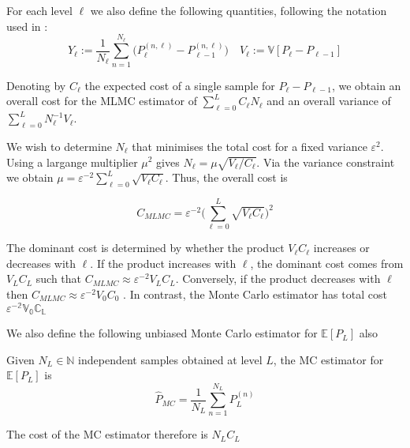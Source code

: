 For each level $\ell$ we also define the following quantities, following the notation
used in \cite{giles2015multilevel}:
\begin{equation*}
    Y_\ell := \frac{1}{N_\ell} \sum_{n=1}^{N_\ell}
    \big( P_\ell^{(n,\ell)} - P_{\ell-1}^{(n,\ell)} \big) 
    \quad
    V_\ell :=  \mathbb{V}[P_\ell - P_{\ell - 1}]
\end{equation*}

Denoting by $C_\ell$ the expected cost of a single sample for $P_\ell - P_{\ell - 1}$,
we obtain an overall cost for the MLMC estimator of $\sum_{\ell=0}^L C_\ell N_\ell$ and 
an overall variance of $\sum_{\ell=0}^L N_\ell^{-1} V_\ell$.

We wish to determine $N_\ell$ that minimises the total cost for a fixed variance $\varepsilon^2$.
Using a largange multiplier $\mu^2$ gives $N_\ell = \mu \sqrt{V_\ell / C_\ell}$. 
Via the variance constraint we obtain $\mu = \varepsilon^{-2} \sum_{\ell=0}^L\sqrt{V_\ell C_\ell}$. 
Thus, the overall cost is

\begin{equation}\label{eq:mlmc_tot_cost}
    C_{MLMC} = \varepsilon^{-2}\big(\sum_{\ell=0}^L\sqrt{V_\ell C_\ell}\big)^2
\end{equation}

The dominant cost is determined by whether the product $V_\ell C_\ell$ increases or decreases with 
$\ell$. If the product increases with $\ell$, the dominant cost comes from $V_L C_L$ such that 
$C_{MLMC} \approx \varepsilon^{-2} V_L C_L$. Conversely, if the product decreases with $\ell$ 
then $C_{MLMC} \approx \varepsilon^{-2}V_0C_0$ \cite{giles2015multilevel}. In contrast, 
the Monte Carlo estimator has total cost $\mathbb{\varepsilon^{-2}V_0C_L}$

We also define the following unbiased Monte Carlo estimator for $\mathbb{E}[P_L]$ also

\begin{definition}[MC Estimator]\label{def:mc_estimator}
    Given $N_L \in \mathbb{N}$ independent samples obtained at level $L$, the MC estimator for 
    $\mathbb{E}[P_L]$ is
    \[
    \hat{P}_{MC} = \frac{1}{N_L}\sum_{n=1}^{N_L}P_L^{(n)}
    \]
\end{definition}

The cost of the MC estimator therefore is $N_L C_L$


